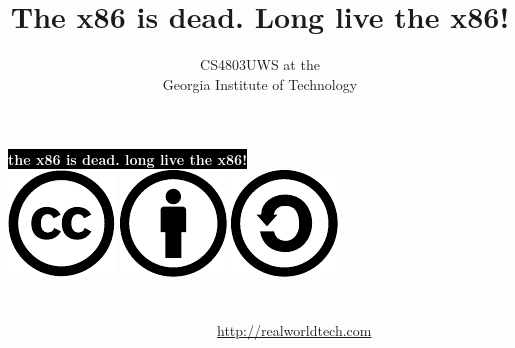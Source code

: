 \documentclass[mathserif,xcolor={dvipsnames,table}]{beamer}
\title{\textbf{The x86 is dead. Long live the x86!}}
\date{}
\author{CS4803UWS at the\\
Georgia Institute of Technology
}
\begin{document}
{
%
\begin{frame}[plain]
\textcolor{white}{
%
\colorbox{black}{\textbf{the x86 is dead. long live the x86!}}
}
\vspace{2.7in}
\\
\hfill\includegraphics[scale=.25]{images/cc-logo.pdf}
\includegraphics[scale=.25]{images/cc-new.pdf}
\includegraphics[scale=.25]{images/cc-share.pdf}
\textcolor{white}{
\\
\hfill \tiny{CC3.0 share-alike attribution}\\
}
\textcolor{white}{
\hfill \scriptsize{copyright \copyright\ 2013}\\
}
\vspace{.6cm}
\textcolor{white}{
\hfill\tiny{with diagrams by david kanter of \href{http://realworldtech.com}{http://realworldtech.com}}
}
\end{frame}
}
\end{document}
